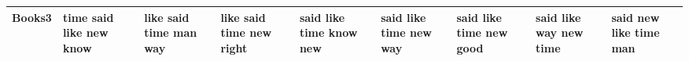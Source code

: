 \documentclass[11pt,a4paper]{article}
\begin{document}
\begin{appendices}
\begin{table*}[htp]
\begin{tiny}
\begin{tabular}{|p{}|p{}|p{}|p{}|p{}|p{}|p{}|p{}|p{}|}
Books3 & time \newline said \newline like \newline new \newline know & like \newline said \newline time \newline man \newline way & like \newline said \newline time \newline new \newline right & said \newline like \newline time \newline know \newline new & said \newline like \newline time \newline new \newline way & said \newline like \newline time \newline new \newline good & said \newline like \newline way \newline new \newline time & said \newline new \newline like \newline time \newline man\\\hline

\end{tabular}
\end{tiny}
\end{table*}
\end{appendices}
\end{document}
